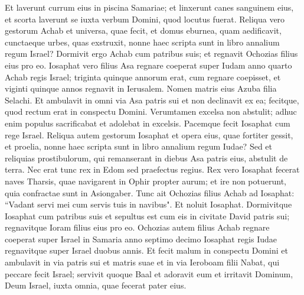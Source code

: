 \begin{biblechapter}
\verse Et laverunt currum eius in piscina Samariae; et linxerunt canes sanguinem eius, et scorta laverunt se iuxta verbum Domini, quod locutus fuerat. 
\verse Reliqua vero gestorum Achab et universa, quae fecit, et domus eburnea, quam aedificavit, cunctaeque urbes, quas exstruxit, nonne haec scripta sunt in libro annalium regum Israel? 
\verse Dormivit ergo Achab cum patribus suis; et regnavit Ochozias filius eius pro eo. 
\verse Iosaphat vero filius Asa regnare coeperat super Iudam anno quarto Achab regis Israel; 
\verse triginta quinque annorum erat, cum regnare coepisset, et viginti quinque annos regnavit in Ierusalem. Nomen matris eius Azuba filia Selachi.  
\verse Et ambulavit in omni via Asa patris sui et non declinavit ex ea; fecitque, quod rectum erat in conspectu Domini. 
\verse Verumtamen excelsa non abstulit; adhuc enim populus sacrificabat et adolebat in excelsis. 
\verse Pacemque fecit Iosaphat cum rege Israel. 
\verse Reliqua autem gestorum Iosaphat et opera eius, quae fortiter gessit, et proelia, nonne haec scripta sunt in libro annalium regum Iudae? 
\verse Sed et reliquias prostibulorum, qui remanserant in diebus Asa patris eius, abstulit de terra. 
\verse Nec erat tunc rex in Edom sed praefectus regius.  
\verse Rex vero Iosaphat fecerat naves Tharsis, quae navigarent in Ophir propter aurum; et ire non potuerunt, quia confractae sunt in Asiongaber. 
\verse Tunc ait Ochozias filius Achab ad Iosaphat: “Vadant servi mei cum servis tuis in navibus". Et noluit Iosaphat. 
\verse Dormivitque Iosaphat cum patribus suis et sepultus est cum eis in civitate David patris sui; regnavitque Ioram filius eius pro eo. 
\verse Ochozias autem filius Achab regnare coeperat super Israel in Samaria anno septimo decimo Iosaphat regis Iudae regnavitque super Israel duobus annis.  
\verse Et fecit malum in conspectu Domini et ambulavit in via patris sui et matris suae et in via Ieroboam filii Nabat, qui peccare fecit Israel; 
\verse servivit quoque Baal et adoravit eum et irritavit Dominum, Deum Israel, iuxta omnia, quae fecerat pater eius.
\end{biblechapter}
